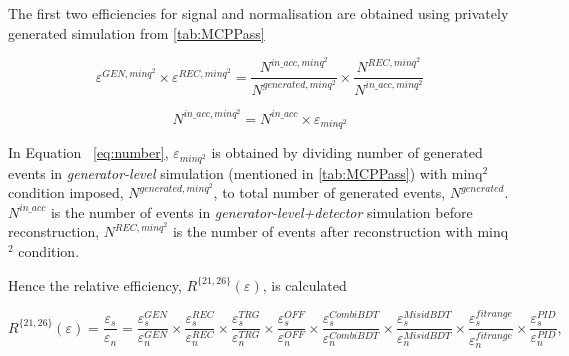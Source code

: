The first two efficiencies for signal and normalisation are obtained using privately generated simulation from \autoref{tab:MCPPass}

\begin{equation}
{\varepsilon^{GEN,minq^{2}}}\times {\varepsilon^{REC,minq^{2}}}= \frac{N^{in\_acc,minq^{2}}}{N^{generated,minq^{2}}}\times \frac{N^{REC,minq^{2}}}{N^{in\_acc,minq^{2}}}
\end{equation}

\begin{equation}
N^{in\_acc,minq^{2}} = N^{in\_acc} \times \varepsilon_{minq^{2}}
\label{eq:number}
\end{equation}

In Equation ~\ref{eq:number}, $\varepsilon_{minq^{2}}$ is obtained by dividing number of generated events in \textit{generator-level} simulation (mentioned in \autoref{tab:MCPPass}) with minq$^2$ condition imposed, $N^{generated,minq^{2}}$, to total number of generated events, $N^{generated}$. $N^{in\_acc}$ is the number of events in \textit{generator-level+detector} simulation before reconstruction, $N^{REC,minq^{2}}$ is the number of events after reconstruction with minq$^2$ condition.

Hence the relative efficiency, $R^{\{21,26\}}(\varepsilon)$, is calculated 


\hspace*{-1.0cm}\begin{equation}
R^{\{21,26\}}(\varepsilon)=\frac{\varepsilon_{s}}{\varepsilon_{n}}=\frac{\varepsilon^{GEN}_{s}}{\varepsilon^{GEN}_{n}} \times \frac{\varepsilon^{REC}_{s}}{\varepsilon^{REC}_{n}} \times \frac{\varepsilon^{TRG}_{s}}{\varepsilon^{TRG}_{n}} \times \frac{\varepsilon^{OFF}_{s}}{\varepsilon^{OFF}_{n}} \times \frac{\varepsilon^{CombiBDT}_{s}}{\varepsilon^{CombiBDT}_{n}} \times \frac{\varepsilon^{MisidBDT}_{s}}{\varepsilon^{MisidBDT}_{n}} \times \frac{\varepsilon^{fitrange}_{s}}{\varepsilon^{fitrange}_{n}} \times \frac{\varepsilon^{PID}_{s}}{\varepsilon^{PID}_{n}},
\label{eq:notsplitted}
\end{equation}

